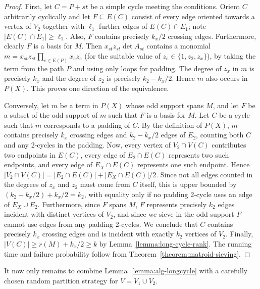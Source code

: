 \documentclass{theoretics}
\begin{document}
\begin{proof}
  First, let $C=P+st$ be a simple cycle meeting the conditions.
  Orient $C$ arbitrarily cyclically and let $F \subseteq E(C)$
  consist of every edge oriented towards a vertex of $V_2$
  together with $\ell_1$ further edges of $E(C) \cap E_1$;
  note $|E(C) \cap E_1| \geq \ell_1$.
  Also, $F$ contains precisely $k_x/2$ crossing edges.
  Furthermore, clearly $F$ is a basis for $M$. 
  Then $x_{st}z_{st} \det A_{st}$ contains a monomial $m=x_{st}z_{st} \prod_{e \in E(P)} x_ez_e$
  (for the suitable value of $z_e \in \{1, z_2, z_x\}$),
  by taking the term from the path $P$ and using only loops for padding.
  The degree of $z_x$ in $m$ is precisely $k_x$
  and the degree of $z_2$ is precisely $k_2-k_x/2$.
  Hence $m$ also occurs in $P(X)$. This proves one direction of the equivalence.

  Conversely, let $m$ be a term in $P(X)$ whose odd support spans $M$,
  and let $F$ be a subset of the odd support of $m$ such that $F$ is a
  basis for $M$. Let $C$ be a cycle such that $m$ corresponds to a
  padding of $C$. By the definition of $P(X)$, $m$ contains precisely $k_x$ crossing
  edges and $k_2-k_x/2$ edges of $E_2$, counting both $C$ and any
  2-cycles in the padding. Now, every vertex of $V_2 \cap V(C)$
  contributes two endpoints in $E(C)$, every edge of $E_2 \cap E(C)$
  represents two such endpoints, and every edge of $E_X \cap E(C)$
  represents one such endpoint. Hence
  $|V_2 \cap V(C)|=|E_2 \cap E(C)|+|E_X \cap E(C)|/2$. 
  Since not all edges counted in the degrees of $z_x$ and $z_2$ must
  come from $C$ itself, this is upper bounded by $(k_2-k_x/2) + k_x/2=k_2$, 
  with equality only if no padding 2-cycle uses an edge of $E_X \cup E_2$.
  Furthermore, since $F$ spans $M$, $F$ represents precisely $k_2$ 
  edges incident with distinct vertices of $V_2$, and since we sieve
  in the odd support $F$ cannot use edges from any padding 2-cycles.
  We conclude that $C$ contains precisely $k_x$ crossing edges and
  is incident with exactly $k_2$ vertices of $V_2$.
  Finally, $|V(C)| \geq r(M)+k_x/2 \geq k$ by Lemma~\ref{lemma:long-cycle-rank}.
  The running time and failure probability follow from Theorem~\ref{theorem:matroid-sieving}.
\end{proof}

It now only remains to combine Lemma~\ref{lemma:alg-longcycle} with a
carefully chosen random partition strategy for $V=V_1 \cup V_2$.
\end{document}
